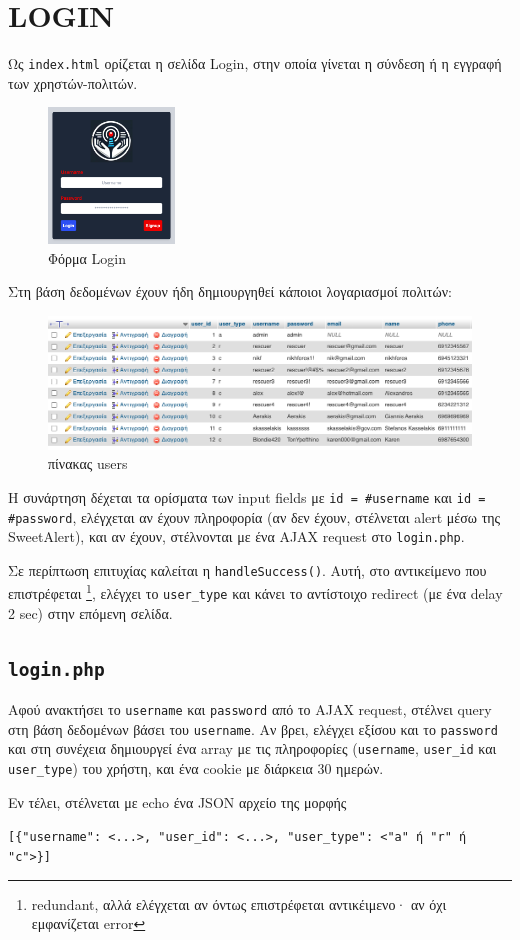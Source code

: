 \section{LOGIN}
    Ως \texttt{index.html} ορίζεται η σελίδα Login, στην οποία γίνεται η σύνδεση ή η εγγραφή των χρηστών-πολιτών.
    \begin{figure}[H] \noindent \centering
        \includegraphics[width=0.3\textwidth]{img/login}
        \caption{Φόρμα Login}
    \end{figure}

    Στη βάση δεδομένων έχουν ήδη δημιουργηθεί κάποιοι λογαριασμοί πολιτών:

    \begin{figure}[H] \noindent \centering
        \includegraphics[width=\textwidth]{img/sql-users}
        \caption{πίνακας users}
    \end{figure}

        Η συνάρτηση  δέχεται τα ορίσματα των input fields με \texttt{id = #username} και \texttt{id = #password},
            ελέγχεται αν έχουν πληροφορία (αν δεν έχουν, στέλνεται alert μέσω της SweetAlert), και αν έχουν,
            στέλνονται με ένα AJAX request στο \texttt{login.php}.

        Σε περίπτωση επιτυχίας καλείται η \texttt{handleSuccess()}.
        Αυτή, στο αντικείμενο που επιστρέφεται \footnote{redundant, αλλά ελέγχεται αν όντως επιστρέφεται αντικέιμενο· αν όχι εμφανίζεται error},
            ελέγχει το \texttt{user\_type} και κάνει το αντίστοιχο redirect (με ένα delay 2 sec) στην επόμενη σελίδα.

    \subsection{\texttt{login.php}}
        Αφού ανακτήσει το \texttt{username} και \texttt{password} από το AJAX request, στέλνει query στη βάση δεδομένων βάσει του \texttt{username}.
        Αν βρει, ελέγχει εξίσου και το \texttt{password} και στη συνέχεια δημιουργεί ένα array με τις πληροφορίες (\texttt{username}, \texttt{user\_id} και \texttt{user\_type}) του χρήστη, και ένα cookie με διάρκεια 30 ημερών.

        Εν τέλει, στέλνεται με echo ένα JSON αρχείο της μορφής
        \begin{graycomment}
            \verb|[{"username": <...>, "user_id": <...>, "user_type": <"a" ή "r" ή "c">}]|
        \end{graycomment}
